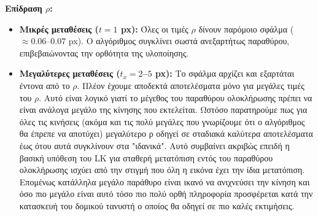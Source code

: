 \documentclass[12pt]{article}
\begin{document}
\textbf{Επίδραση $\rho$:}
\begin{itemize}
    \item \textbf{Μικρές μεταθέσεις ($t=1$ px):} Όλες οι τιμές $\rho$ δίνουν παρόμοιο σφάλμα ($\approx 0.06$--$0.07$ px). Ο αλγόριθμος συγκλίνει σωστά ανεξαρτήτως παραθύρου, επιβεβαιώνοντας την ορθότητα της υλοποίησης.

    \item \textbf{Μεγαλύτερες μεταθέσεις ($t_x = 2$--$5$ px):} Το σφάλμα αρχίζει και εξαρτάται έντονα από το $\rho$. Πλέον έχουμε αποδεκτά αποτελέσματα μόνο για μεγάλες τιμές του $\rho$. Αυτό είναι λογικό γιατί το μέγεθος του παραθύρου ολοκλήρωσης πρέπει να είναι ανάλογα μεγάλο της κίνησης που εκτελείται. Ωστόσο παρατηρούμε πως για όλες τις κινήσεις (ακόμα και τις πολύ μεγάλες που γνωρίζουμε ότι ο αλγόριθμος θα έπρεπε να αποτύχει) μεγαλύτερο ρ οδηγεί σε σταδιακά καλύτερα αποτελέσματα έως ότου αυτά συγκλίνουν στα "ιδανικά". Αυτό συμβαίνει ακριβώς επειδή η βασική υπόθεση του LK για σταθερή μετατόπιση εντός του παραθύρου ολοκλήρωσης ισχύει από την στιγμή που όλη η εικόνα έχει την ίδια μετατόπιση. Επομένως κατάλληλα μεγάλο παράθυρο είναι ικανό να ανιχνεύσει την κίνηση και όσο πιο μεγάλο είναι αυτό τόσο πιο πολύ ορθή πληροφορία προσφέρεται κατά την κατασκευή του δομικού τανυστή ο οποίος θα οδηγεί σε πιο καλές εκτιμήσεις.
\end{itemize}
\end{document}
